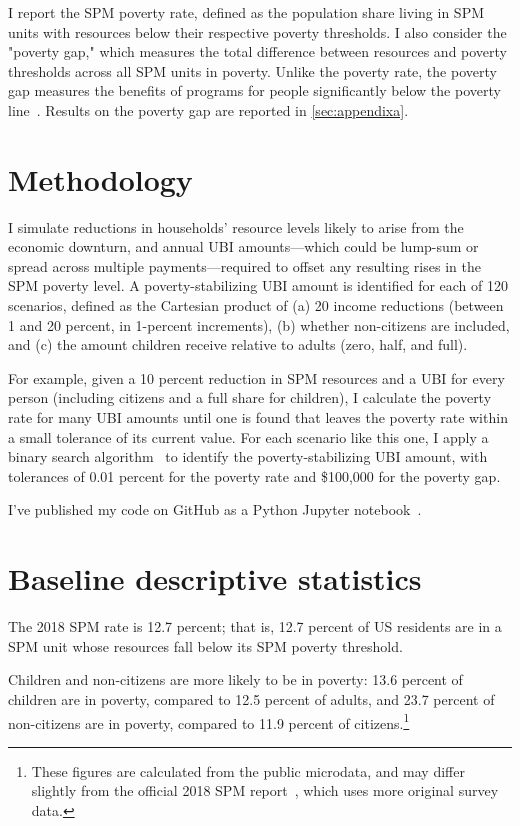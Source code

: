 \documentclass[12pt]{article}
\begin{document}
I report the SPM poverty rate, defined as the population share living in SPM units with resources below their respective poverty thresholds. I also consider the "poverty gap," which measures the total difference between resources and poverty thresholds across all SPM units in poverty. Unlike the poverty rate, the poverty gap measures the benefits of programs for people significantly below the poverty line~\cite{bruenig}. Results on the poverty gap are reported in \autoref{sec:appendixa}.


\section{Methodology} \label{sec:methodology}

I simulate reductions in households' resource levels likely to arise from the economic downturn, and annual UBI amounts---which could be lump-sum or spread across multiple payments---required to offset any resulting rises in the SPM poverty level. A poverty-stabilizing UBI amount is identified for each of 120 scenarios, defined as the Cartesian product of (a) 20 income reductions (between 1 and 20 percent, in 1-percent increments), (b) whether non-citizens are included, and (c) the amount children receive relative to adults (zero, half, and full).

For example, given a 10 percent reduction in SPM resources and a UBI for every person (including citizens and a full share for children), I calculate the poverty rate for many UBI amounts until one is found that leaves the poverty rate within a small tolerance of its current value. For each scenario like this one, I apply a binary search algorithm~\cite{binary_search} to identify the poverty-stabilizing UBI amount, with tolerances of 0.01 percent for the poverty rate and \$100,000 for the poverty gap.

I've published my code on GitHub as a Python Jupyter notebook~\cite{notebook}.


\section{Baseline descriptive statistics} \label{sec:baseline_descriptive_statistics}

The 2018 SPM rate is 12.7 percent; that is, 12.7 percent of US residents are in a SPM unit whose resources fall below its SPM poverty threshold.

Children and non-citizens are more likely to be in poverty: 13.6 percent of children are in poverty, compared to 12.5 percent of adults, and 23.7 percent of non-citizens are in poverty, compared to 11.9 percent of citizens.\footnote{These figures are calculated from the public microdata, and may differ slightly from the official 2018 SPM report~\cite{spm}, which uses more original survey data.}
\end{document}
